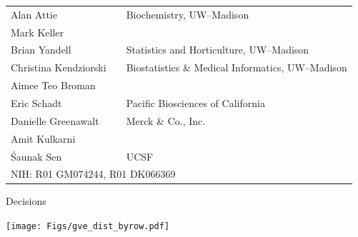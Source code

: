 \documentclass[12pt]{article}
\newcommand{\headsize}{\fontsize{35}{35} \selectfont}
\begin{document}
\hfill \begin{minipage}{10in}

\setlength{\tabcolsep}{5mm}
\begin{tabular}{lll}
Alan Attie&&
{\color{myblue} Biochemistry, UW--Madison} \\
Mark Keller &&
\\[24pt]

Brian Yandell &&
{\color{myblue} Statistics and Horticulture, UW--Madison} \\[24pt]

Christina Kendziorski &&
{\color{myblue} Biostatistics \& Medical Informatics, UW--Madison} \\
Aimee Teo Broman && \\[24pt]

Eric Schadt &&
{\color{myblue} Pacific Biosciences of California} \\[24pt]

Danielle Greenawalt &&
{\color{myblue} Merck \& Co., Inc.} \\
Amit Kulkarni && \\[24pt]

\'Saunak Sen &&
{\color{myblue} UCSF} \\[48pt]

\multicolumn{3}{l}{\color{mypink}NIH: \color{myblue} R01 GM074244, R01 DK066369}


\end{tabular}
\end{minipage}

\newpage


\headsize \color{myyellow}
\hfill \begin{minipage}{5.75in}
\centering
Decisions
\end{minipage}

\vfill

\centerline{\texttt{[image: Figs/gve\_dist\_byrow.pdf]}}
\end{document}
